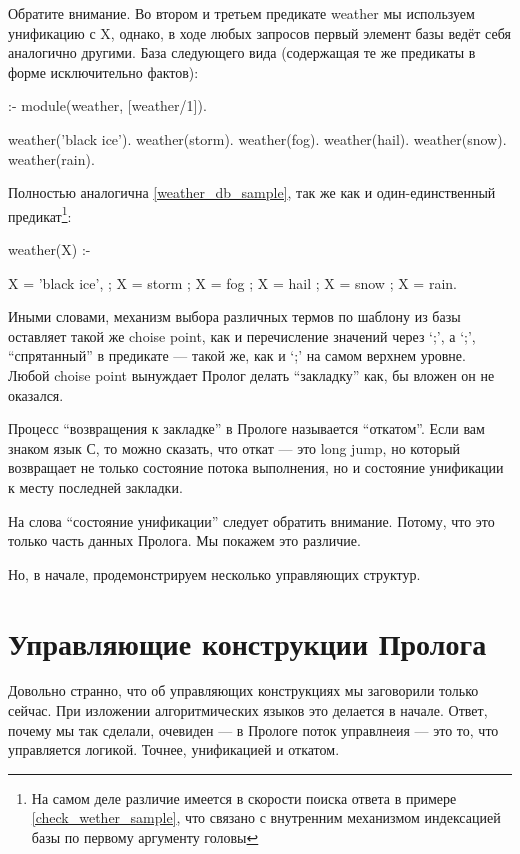 \documentclass[a4paper]{book}
\begin{document}
Обратите внимание. Во втором и третьем предикате weather мы
используем унификацию с X, однако, в ходе любых запросов первый
элемент базы ведёт себя аналогично другими. База следующего вида
(содержащая те же предикаты в форме исключительно фактов):

\begin{example}{}{}
:- module(weather, [weather/1]).

weather('black ice').
weather(storm).
weather(fog).
weather(hail).
weather(snow).
weather(rain).
\end{example}

Полностью аналогична \ref{weather_db_sample}, так же как и
один-единственный предикат\footnote{На самом деле различие
  имеется в скорости поиска ответа в примере
  \ref{check_wether_sample}, что связано с внутренним механизмом
  индексацией базы по первому аргументу головы }:

\begin{example}{}{}
weather(X) :- 

     X = 'black ice',
   ; X = storm
   ; X = fog
   ; X = hail
   ; X = snow
   ; X = rain.
\end{example}


Иными словами, механизм выбора различных термов по шаблону из
базы оставляет такой же choise point, как и перечисление значений
через `;', а `;', ``спрятанный'' в предикате --- такой же, как и
`;' на самом верхнем уровне. Любой choise point вынуждает Пролог
делать ``закладку'' как, бы вложен он не оказался.

Процесс ``возвращения к закладке'' в Прологе называется
``откатом''. Если вам знаком язык С, то можно сказать, что откат
--- это long jump, но который возвращает не только состояние
потока выполнения, но и состояние унификации к месту последней
закладки.

На слова ``состояние унификации'' следует обратить
внимание. Потому, что это только часть данных Пролога. Мы покажем
это различие.

Но, в начале, продемонстрируем несколько управляющих структур.

\section{Управляющие конструкции Пролога}

Довольно странно, что об управляющих конструкциях мы заговорили
только сейчас. При изложении алгоритмических языков это делается
в начале. Ответ, почему мы так сделали, очевиден --- в Прологе
поток управлнеия --- это то, что управляется логикой. Точнее,
унификацией и откатом.
\end{document}
